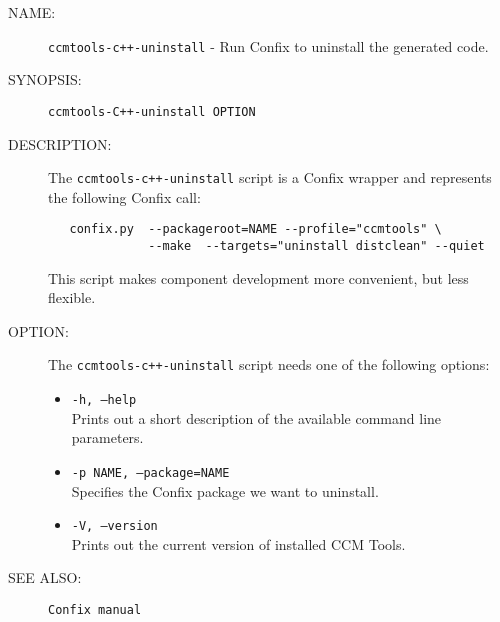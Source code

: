 \begin{description}

\item [NAME:] 
  {\tt ccmtools-c++-uninstall} - Run Confix to uninstall the generated code.

\item [SYNOPSIS:] 
  {\tt ccmtools-C++-uninstall OPTION}

\item [DESCRIPTION:]
  The {\tt ccmtools-c++-uninstall} script is a Confix wrapper and
  represents the following Confix call:
  \begin{small}
  \begin{verbatim}
   confix.py  --packageroot=NAME --profile="ccmtools" \
              --make  --targets="uninstall distclean" --quiet
  \end{verbatim}
  \end{small}
  This script makes component development more convenient,
  but less flexible. 

\item [OPTION:]
  The {\tt ccmtools-c++-uninstall} script needs one of the following options:
  \begin{itemize}
  \item {\tt -h, --help} \\
    Prints out a short description of the available command line parameters.

  \item {\tt -p NAME, --package=NAME} \\
    Specifies the Confix package we want to uninstall. 

  \item {\tt -V, --version} \\
    Prints out the current version of installed CCM Tools.
  \end{itemize}
  
\item [SEE ALSO:]
  {\tt Confix manual}
  
\end{description}
